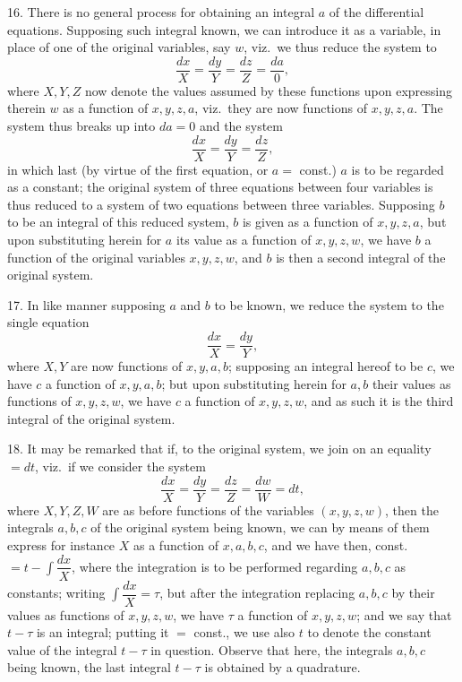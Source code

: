\documentclass[11pt,a4paper]{article}
\begin{document}
\newpage


16. There is no general process for obtaining an integral $a$ of the differential equations. Supposing such integral known, we can introduce it as a variable, in place of one of the original variables, say $w$, viz.\ we thus reduce the system to
\[
\frac{dx}{X} = \frac{dy}{Y} = \frac{dz}{Z} = \frac{da}{0},
\]
where $X, Y, Z$ now denote the values assumed by these functions upon expressing therein $w$ as a function of $x, y, z, a$, viz.\ they are now functions of $x, y, z, a$. The system thus breaks up into $da = 0$ and the system
\[
\frac{dx}{X} = \frac{dy}{Y} = \frac{dz}{Z},
\]
in which last (by virtue of the first equation, or $a = $ const.) $a$ is to be regarded as a constant; the original system of three equations between four variables is thus reduced to a system of two equations between three variables. Supposing $b$ to be an integral of this reduced system, $b$ is given as a function of $x, y, z, a$, but upon substituting herein for $a$ its value as a function of $x, y, z, w$, we have $b$ a function of the original variables $x, y, z, w$, and $b$ is then a second integral of the original system.

17. In like manner supposing $a$ and $b$ to be known, we reduce the system to the single equation
\[
\frac{dx}{X} = \frac{dy}{Y},
\]
where $X, Y$ are now functions of $x, y, a, b$; supposing an integral hereof to be $c$, we have $c$ a function of $x, y, a, b$; but upon substituting herein for $a, b$ their values as functions of $x, y, z, w$, we have $c$ a function of $x, y, z, w$, and as such it is the third integral of the original system.

18. It may be remarked that if, to the original system, we join on an equality $= dt$, viz.\ if we consider the system
\[
\frac{dx}{X} = \frac{dy}{Y} = \frac{dz}{Z} = \frac{dw}{W} = dt,
\]
where $X, Y, Z, W$ are as before functions of the variables $(x, y, z, w)$, then the integrals $a, b, c$ of the original system being known, we can by means of them express for instance $X$ as a function of $x, a, b, c$, and we have then, const.\ $= t - \displaystyle\int \dfrac{dx}{X}$, where the integration is to be performed regarding $a, b, c$ as constants; writing $\displaystyle\int \dfrac{dx}{X} = \tau$, but after the integration replacing $a, b, c$ by their values as functions of $x, y, z, w$, we have $\tau$ a function of $x, y, z, w$; and we say that $t - \tau$ is an integral; putting it $= $ const., we use also $t$ to denote the constant value of the integral $t - \tau$ in question. Observe that here, the integrals $a, b, c$ being known, the last integral $t - \tau$ is obtained by a quadrature.
\end{document}
